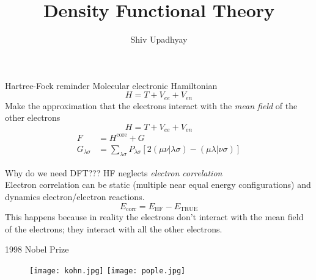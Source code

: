 \documentclass{beamer}
\title{{\Huge Density Functional Theory}}
\author[Shiv]{Shiv Upadhyay}
\institute{\normalsize{\textit{University of Pittsburgh}
\vspace{0.3cm}}}
\begin{document}
\frame{\vspace{-1.25cm}\titlepage}
\begin{frame}[t]{Hartree-Fock reminder}
Molecular electronic Hamiltonian
\begin{equation*}
H = T + V_{ee} + V_{en}
\end{equation*}
\pause
Make the approximation that the electrons interact with the \emph{mean field} of the other electrons\\
\pause
\begin{equation*}
H = T + V_{ee} + V_{en}
\end{equation*}
\pause
\begin{align*}
F &= H^{\mathrm{core}} + G \\
G_{\lambda\sigma} &= \sum_{\lambda\sigma} P_{\lambda\sigma}[2(\mu\nu|\lambda\sigma) - (\mu\lambda|\nu\sigma)]
\end{align*}
\end{frame}
\begin{frame}[t]{Why do we need DFT???}
HF neglects \emph{electron correlation}\\ \vfill
\pause
Electron correlation can be static (multiple near equal energy configurations) and dynamics electron/electron reactions. \\ \vfill
\begin{equation}
E_{\mathrm{corr}} = E_{\mathrm{HF}} - E_{\mathrm{TRUE}}
\end{equation}
\pause
\vfill
This happens because in reality the electrons don't interact with the mean field of the electrons; they interact with all the other electrons.
\vfill
\end{frame}
\begin{frame}[t]{1998 Nobel Prize}
\begin{figure}
\texttt{[image: kohn.jpg]}
\texttt{[image: pople.jpg]}
\end{figure}
\end{frame}
\begin{frame}[t]{}

\end{frame}
\end{document}
